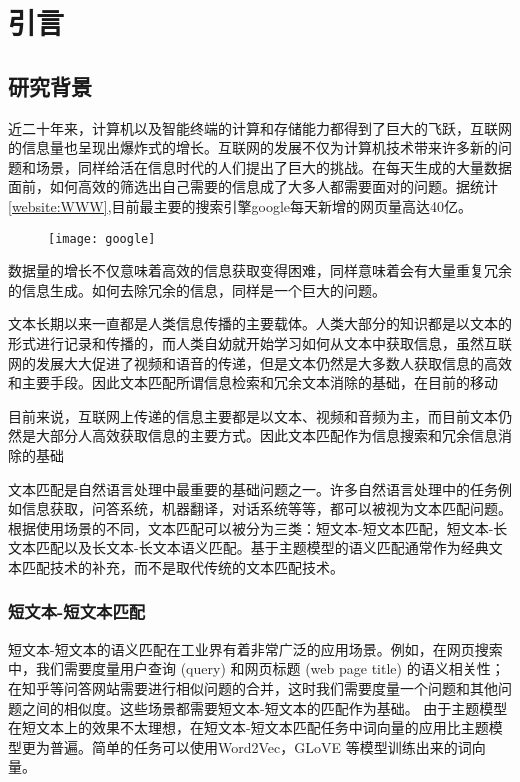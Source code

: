 
\chapter{引言}
\label{chap:introduction}

\section{研究背景}
近二十年来，计算机以及智能终端的计算和存储能力都得到了巨大的飞跃，互联网的信息量也呈现出爆炸式的增长。互联网的发展不仅为计算机技术带来许多新的问题和场景，同样给活在信息时代的人们提出了巨大的挑战。在每天生成的大量数据面前，如何高效的筛选出自己需要的信息成了大多人都需要面对的问题。据统计\ref{website:WWW},目前最主要的搜索引擎google每天新增的网页量高达40亿。

\begin{figure}[!htbp]
    \centering
    \texttt{[image: google]}
    \label{fig:user-ad-match}
\end{figure}

数据量的增长不仅意味着高效的信息获取变得困难，同样意味着会有大量重复冗余的信息生成。如何去除冗余的信息，同样是一个巨大的问题。

文本长期以来一直都是人类信息传播的主要载体。人类大部分的知识都是以文本的形式进行记录和传播的，而人类自幼就开始学习如何从文本中获取信息，虽然互联网的发展大大促进了视频和语音的传递，但是文本仍然是大多数人获取信息的高效和主要手段。因此文本匹配所谓信息检索和冗余文本消除的基础，在目前的移动

目前来说，互联网上传递的信息主要都是以文本、视频和音频为主，而目前文本仍然是大部分人高效获取信息的主要方式。因此文本匹配作为信息搜索和冗余信息消除的基础

文本匹配是自然语言处理中最重要的基础问题之一。许多自然语言处理中的任务例如信息获取，问答系统，机器翻译，对话系统等等，都可以被视为文本匹配问题。根据使用场景的不同，文本匹配可以被分为三类：短文本-短文本匹配，短文本-长文本匹配以及长文本-长文本语义匹配。基于主题模型的语义匹配通常作为经典文本匹配技术的补充，而不是取代传统的文本匹配技术。
\subsection{短文本-短文本匹配}
短文本-短文本的语义匹配在工业界有着非常广泛的应用场景。例如，在网页搜索中，我们需要度量用户查询 (query) 和网页标题 (web page title) 的语义相关性；在知乎等问答网站需要进行相似问题的合并，这时我们需要度量一个问题和其他问题之间的相似度。这些场景都需要短文本-短文本的匹配作为基础。 由于主题模型在短文本上的效果不太理想，在短文本-短文本匹配任务中词向量的应用比主题模型更为普遍。简单的任务可以使用Word2Vec，GLoVE 等模型训练出来的词向量。


